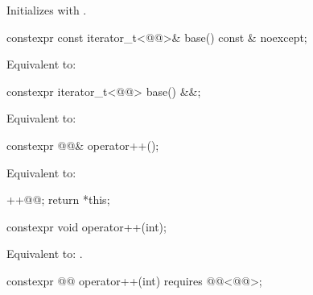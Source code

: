 \begin{itemdescr}
\pnum
\effects
Initializes  with .
\end{itemdescr}

%
\begin{itemdecl}
constexpr const iterator_t<@@>& base() const & noexcept;
\end{itemdecl}

\begin{itemdescr}
\pnum
\effects
Equivalent to: 
\end{itemdescr}

%
\begin{itemdecl}
constexpr iterator_t<@@> base() &&;
\end{itemdecl}

\begin{itemdescr}
\pnum
\effects
Equivalent to: 
\end{itemdescr}

%
\begin{itemdecl}
constexpr @@& operator++();
\end{itemdecl}

\begin{itemdescr}
\pnum
\effects
Equivalent to:
\begin{codeblock}
++@@;
return *this;
\end{codeblock}
\end{itemdescr}

%
\begin{itemdecl}
constexpr void operator++(int);
\end{itemdecl}

\begin{itemdescr}
\pnum
\effects
Equivalent to: .
\end{itemdescr}

%
\begin{itemdecl}
constexpr @@ operator++(int) requires @@<@@>;
\end{itemdecl}

